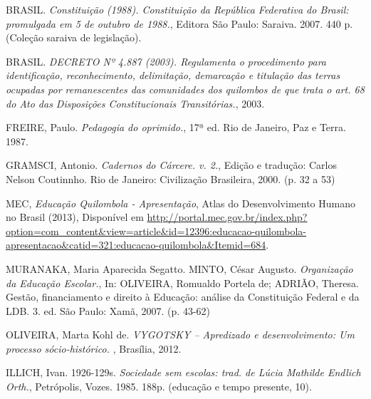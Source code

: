 \begin{thebibliography}{9}

 BRASIL.  \emph{Constituição (1988). Constituição da República Federativa do Brasil: promulgada em 5 de outubro de 1988.}, Editora São Paulo: Saraiva. 2007. 440 p. (Coleção saraiva de legislação).

 BRASIL.  \emph{DECRETO Nº 4.887 (2003). Regulamenta o procedimento para identificação, reconhecimento, delimitação, demarcação e titulação das terras ocupadas por remanescentes das comunidades dos quilombos de que trata o art. 68 do Ato das Disposições Constitucionais Transitórias.}, 2003.

 FREIRE, Paulo.  \emph{Pedagogia do oprimido.}, 17ª ed. Rio de Janeiro, Paz e Terra. 1987.

 GRAMSCI, Antonio.  \emph{Cadernos do Cárcere. v. 2.}, Edição e tradução: Carlos Nelson Coutinnho. Rio de Janeiro: Civilização Brasileira, 2000. (p. 32 a 53)

 MEC, \emph{Educação Quilombola - Apresentação},  Atlas do Desenvolvimento Humano no Brasil (2013), Disponível em 
\url{http://portal.mec.gov.br/index.php?option=com_content&view=article&id=12396:educacao-quilombola-apresentacao&catid=321:educacao-quilombola&Itemid=684}.

 MURANAKA, Maria Aparecida Segatto. MINTO, César Augusto.  \emph{Organização da Educação Escolar.},  In: OLIVEIRA, Romualdo Portela de; ADRIÃO, Theresa. Gestão, financiamento e direito à Educação: análise da Constituição Federal e da LDB. 3. ed. São Paulo: Xamã, 2007. (p. 43-62)

 OLIVEIRA, Marta Kohl de. \emph{VYGOTSKY – Apredizado e desenvolvimento: Um processo sócio-histórico.
}, Brasília, 2012.

 ILLICH, Ivan. 1926-129s.  \emph{Sociedade sem escolas: trad. de Lúcia Mathilde Endlich Orth.}, Petrópolis, Vozes. 1985. 188p. (educação e tempo presente, 10).






\end{thebibliography}